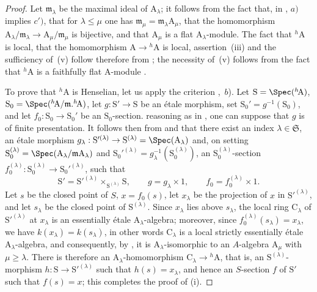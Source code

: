 \begin{proof}
Let $\mathfrak{m}_\lambda$ be the maximal ideal of $\mathrm{A}_\lambda$;
it follows from the fact that, in , $a)$ implies $c')$, that for $\lambda\leq\mu$ one has $\mathfrak{m}_\mu=\mathfrak{m}_\lambda\mathrm{A}_\mu$, that the homomorphism $\mathrm{A}_\lambda/\mathfrak{m}_\lambda\to\mathrm{A}_\mu/\mathfrak{m}_\mu$ is bijective, and that $\mathrm{A}_\mu$ is a flat $\mathrm{A}_\lambda$-module.
The fact that ${}^h\!\mathrm{A}$ is local, that the homomorphism $\mathrm{A}\to{}^h\!\mathrm{A}$ is local, assertion~(iii) and the sufficiency of~(v) follow therefore from ;
the necessity of~(v) follows from the fact that ${}^h\!\mathrm{A}$ is a faithfully flat A-module .

To prove that ${}^h\!\mathrm{A}$ is Henselian, let us apply the criterion ,~$b$).
Let $\mathrm{S}=\Spec({}^h\!\mathrm{A})$, $\mathrm{S}_0=\Spec({}^h\!\mathrm{A}/\mathfrak{m}.{}^h\!\mathrm{A})$, let $g:\mathrm{S}'\to\mathrm{S}$ be an \'{e}tale morphism, set $\mathrm{S}_0'=g^{-1}(\mathrm{S}_0)$, and let $f_0:\mathrm{S}_0\to\mathrm{S}_0'$ be an $\mathrm{S}_0$-section.
reasoning as in , one can suppose that $g$ is of finite presentation.
It follows then from  and  that there exist an index $\lambda\in\mathfrak{S}$, an \'etale morphism $g_\lambda:\mathrm{S}'^{(\lambda)}\to\mathrm{S}^{(\lambda)}=\Spec(\mathrm{A}_\lambda)$ and, on setting $\mathrm{S}_0^{(\lambda)}=\Spec(\mathrm{A}_\lambda/\mathfrak{m}\mathrm{A}_\lambda)$ and $\mathrm{S}_0'^{(\lambda)}=g_\lambda^{-1}(\mathrm{S}_0^{(\lambda)})$, an $\mathrm{S}_0^{(\lambda)}$-section $f_0^{(\lambda)}:\mathrm{S}_0^{(\lambda)}\to\mathrm{S}_0'^{(\lambda)}$, such that
\[
\mathrm{S}'=\mathrm{S}'^{(\lambda)}\times_{\mathrm{S}^{(\lambda)}}\mathrm{S},\qquad
g=g_\lambda\times 1,\qquad
f_0=f_0^{(\lambda)}\times 1.
\]
Let $s$ be the closed point of $S$, $x=f_0(s)$, let $x_\lambda$ be the projection of $x$ in $\mathrm{S}'^{(\lambda)}$, and let $s_\lambda$ be the closed point of $\mathrm{S}^{(\lambda)}$.
Since $x_\lambda$ lies above $s_\lambda$, the local ring $\mathrm{C}_\lambda$ of $\mathrm{S}'^{(\lambda)}$ at $x_\lambda$ is an essentially \'etale $\mathrm{A}_\lambda$-algebra;
moreover, since $f_0^{(\lambda)}(s_\lambda)=x_\lambda$, we have $k(x_\lambda)=k(s_\lambda)$, in other words $\mathrm{C}_\lambda$ is a local strictly essentially \'etale $\mathrm{A}_\lambda$-algebra, and consequently, by , it is $\mathrm{A}_\lambda$-isomorphic to an $A$-algebra $\mathrm{A}_\mu$ with $\mu\geq\lambda$.
There is therefore an $\mathrm{A}_\lambda$-homomorphism $\mathrm{C}_\lambda\to{}^h\!\mathrm{A}$, that is, an $\mathrm{S}^{(\lambda)}$-morphism $h:\mathrm{S}\to\mathrm{S}'^{(\lambda)}$ such that $h(s)=x_\lambda$, and hence an $S$-section $f$ of $\mathrm{S}'$ such that $f(s)=x$;
this completes the proof of (i).


\end{proof}
